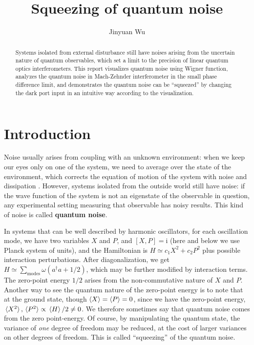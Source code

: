 \documentclass[hyperref, a4paper]{article}
\title{Squeezing of quantum noise}
\author{Jinyuan Wu}
\newcommand*{\ii}{\mathrm{i}}
\newcommand*{\concept}[1]{{\textbf{#1}}}
\begin{document}
    
\maketitle

\begin{abstract}
    Systems isolated from external disturbance still have noises 
    arising from the uncertain nature of quantum observables,
    which set a limit to the precision of linear quantum optics interferometers.
    This report visualizes quantum noise using Wigner function,
    analyzes the quantum noise in Mach-Zehnder interferometer 
    in the small phase difference limit,
    and demonstrates the quantum noise can be ``squeezed''
    by changing the dark port input
    in an intuitive way according to the visualization.
\end{abstract}

\section{Introduction}

Noise usually arises from coupling with an unknown environment:
when we keep our eyes only on one of the system,
we need to average over the state of the environment,
which corrects the equation of motion of the system 
with noise and dissipation \cite{zwanzig_nonequilibrium_2001}.
However, systems isolated from the outside world still have noise:
if the wave function of the system is not an eigenstate of the observable in question, 
any experimental setting measuring that observable has noisy results.
This kind of noise is called \concept{quantum noise}.

In systems that can be well described by 
harmonic oscillators,
for each oscillation mode, 
we have two variables $X$ and $P$, and $[X, P] = \ii$
(here and below we use Planck system of units),
and the Hamiltonian is $H \simeq c_1 X^2 + c_2 P^2$ 
plus possible interaction perturbations.
After diagonalization, we get $H \simeq \sum_{\text{modes}} \omega (a^\dagger a + 1/2)$,
which may be further modified by interaction terms.
The zero-point energy $1/2$ arises from the non-commutative nature of $X$ and $P$.
Another way to see the quantum nature of the zero-point energy is to note that at the ground state,
though $\expval{X} = \expval{P} = 0$,
since we have the zero-point energy,
$\expval*{X^2}, \expval*{P^2} \propto \expval*{H} / 2 \neq 0$.
We therefore sometimes say that 
quantum noise comes from the zero point-energy.
Of course, by manipulating the quantum state, 
the variance of \emph{one} degree of freedom 
may be reduced,
at the cost of larger variances on other degrees of freedom.
This is called ``squeezing'' of the quantum noise.
\end{document}
